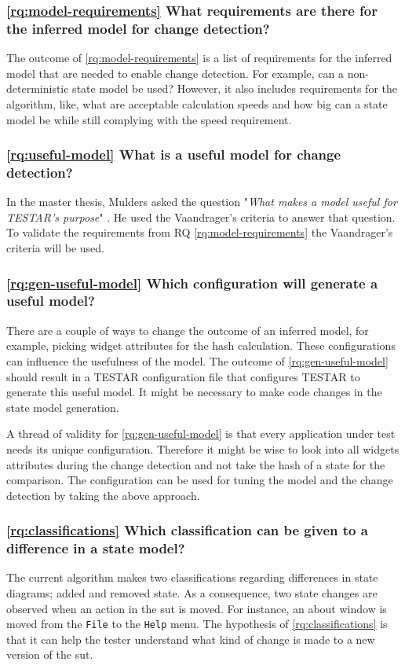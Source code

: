\subsubsection{\ref{rq:model-requirements} What requirements are there for the inferred model for change detection?}
The outcome of \ref{rq:model-requirements} is a list of requirements for the inferred model that are needed to enable change detection. For example, can a non-deterministic state model be used? However, it also includes requirements for the algorithm, like, what are acceptable calculation speeds and how big can a state model be while still complying with the speed requirement. 

\subsubsection{\ref{rq:useful-model} What is a useful model for change detection?}
In the master thesis, Mulders asked the question "\textit{What makes a model useful for TESTAR's purpose}" \cite{thesisMulders}. He used the Vaandrager's criteria \cite{vaandrager} to answer that question. To validate the requirements from RQ \ref{rq:model-requirements} the Vaandrager's criteria will be used. 

\subsubsection{\ref{rq:gen-useful-model} Which configuration will generate a useful model?}
There are a couple of ways to change the outcome of an inferred model, for example, picking widget attributes for the hash calculation. These configurations can influence the usefulness of the model. The outcome of \ref{rq:gen-useful-model} should result in a TESTAR configuration file that configures TESTAR to generate this useful model. It might be necessary to make code changes in the state model generation.

A thread of validity for \ref{rq:gen-useful-model} is that every application under test needs its unique configuration. Therefore it might be wise to look into all widgets attributes during the change detection and not take the hash of a state for the comparison. The configuration can be used for tuning the model and the change detection by taking the above approach.

\subsubsection{\ref{rq:classifications} Which classification can be given to a difference in a state model?}
The current algorithm \cite{stateDiff} makes two classifications regarding differences in state diagrams; added and removed state. As a consequence, two state changes are observed when an action in the \acrshort{sut} is moved. For instance, an about window is moved from the \verb|File| to the \verb|Help| menu. The hypothesis of \ref{rq:classifications} is that it can help the tester understand what kind of change is made to a new version of the \acrshort{sut}.

